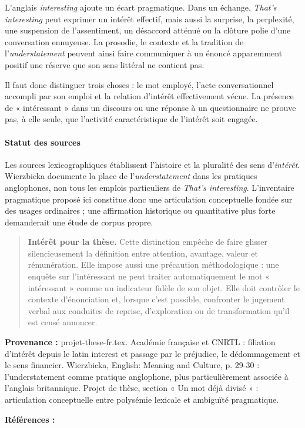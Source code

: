 \documentclass[10pt,a4paper]{article}
\begin{document}
L'anglais \emph{interesting} ajoute un écart pragmatique. Dans un échange, \emph{That's interesting} peut exprimer un intérêt effectif, mais aussi la surprise, la perplexité, une suspension de l'assentiment, un désaccord atténué ou la clôture polie d'une conversation ennuyeuse. La prosodie, le contexte et la tradition de l'\emph{understatement} peuvent ainsi faire communiquer à un énoncé apparemment positif une réserve que son sens littéral ne contient pas.

Il faut donc distinguer trois choses : le mot employé, l'acte conversationnel accompli par son emploi et la relation d'intérêt effectivement vécue. La présence de « intéressant » dans un discours ou une réponse à un questionnaire ne prouve pas, à elle seule, que l'activité caractéristique de l'intérêt soit engagée.

\paragraph{Statut des sources}
Les sources lexicographiques établissent l'histoire et la pluralité des sens d'\emph{intérêt}. Wierzbicka documente la place de l'\emph{understatement} dans les pratiques anglophones, non tous les emplois particuliers de \emph{That's interesting}. L'inventaire pragmatique proposé ici constitue donc une articulation conceptuelle fondée sur des usages ordinaires ; une affirmation historique ou quantitative plus forte demanderait une étude de corpus propre.

\begin{quote}
\textbf{Intérêt pour la thèse.} Cette distinction empêche de faire glisser silencieusement la définition entre attention, avantage, valeur et rémunération. Elle impose aussi une précaution méthodologique : une enquête sur l'intéressant ne peut traiter automatiquement le mot « intéressant » comme un indicateur fidèle de son objet. Elle doit contrôler le contexte d'énonciation et, lorsque c'est possible, confronter le jugement verbal aux conduites de reprise, d'exploration ou de transformation qu'il est censé annoncer.
\end{quote}
{\footnotesize\color{metadata}\textbf{Provenance :} projet-these-fr.tex. Académie française et CNRTL : filiation d'intérêt depuis le latin interest et passage par le préjudice, le dédommagement et le sens financier. Wierzbicka, English: Meaning and Culture, p. 29-30 : l'understatement comme pratique anglophone, plus particulièrement associée à l'anglais britannique. Projet de thèse, section « Un mot déjà divisé » : articulation conceptuelle entre polysémie lexicale et ambiguïté pragmatique.\par}
{\footnotesize\color{metadata}\textbf{Références :} \parencite{academie2026interet,cnrtl2026interet,wierzbicka2006english}\par}
\end{document}
